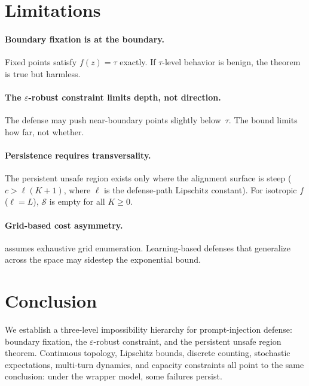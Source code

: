 \documentclass{article}
\begin{document}
\section{Limitations}
\label{sec:limitations}

\paragraph{Boundary fixation is at the boundary.}
Fixed points satisfy $f(z) = \tau$ exactly. If $\tau$-level behavior
is benign, the theorem is true but harmless.

\paragraph{The $\varepsilon$-robust constraint limits depth, not direction.}
The defense may push near-boundary points slightly below~$\tau$. The
bound limits how far, not whether.

\paragraph{Persistence requires transversality.}
The persistent unsafe region exists only where the alignment surface
is steep ($c > \ell(K+1)$, where $\ell$ is the defense-path
Lipschitz constant). For isotropic $f$ ($\ell = L$), $\mathcal{S}$
is empty for all $K \geq 0$.

\paragraph{Grid-based cost asymmetry.}
 assumes exhaustive grid enumeration. Learning-based
defenses that generalize across the space may sidestep the exponential
bound.


\section{Conclusion}
\label{sec:conclusion}

We establish a three-level impossibility hierarchy for prompt-injection
defense: boundary fixation, the $\varepsilon$-robust constraint, and the
persistent unsafe region theorem. Continuous topology, Lipschitz bounds,
discrete counting, stochastic expectations, multi-turn dynamics, and
capacity constraints all point to the same conclusion: under the
wrapper model, some failures persist. 
\end{document}
